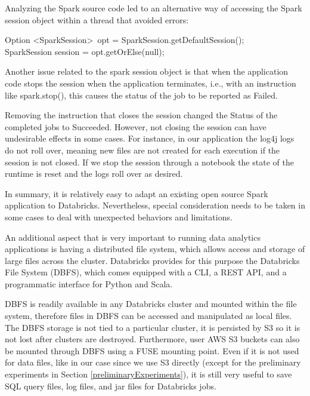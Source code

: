 Analyzing the Spark source code led to an alternative way of accessing the Spark session object within a thread that avoided errors:

\vspace{0.5cm}
\noindent Option \textless SparkSession\textgreater \ opt = SparkSession.getDefaultSession();\\
SparkSession session = opt.getOrElse(null);
\vspace{0.5cm}

Another issue related to the spark session object is that when the application code stops the session when the application terminates, i.e., with an instruction like spark.stop(), this causes the status of the job to be reported as Failed.

Removing the instruction that closes the session changed the Status of the completed jobs to Succeeded. However, not closing the session can have undesirable effects in some cases. For instance, in our application the log4j logs do not roll over, meaning new files are not created for each execution if the session is not closed. If we stop the session through a notebook the state of the runtime is reset and the logs roll over as desired.

In summary, it is relatively easy to adapt an existing open source Spark application to Databricks. Nevertheless, special consideration needs to be taken in some cases to deal with unexpected behaviors and limitations.

An additional aspect that is very important to running data analytics applications is having a distributed file system, which allows access and storage of large files across the cluster. Databricks provides for this purpose the Databricks File System (DBFS), which comes equipped with a CLI, a REST API, and a programmatic interface for Python and Scala.

DBFS is readily available in any Databricks cluster and mounted within the file system, therefore files in DBFS can be accessed and manipulated as local files. The DBFS storage is not tied to a particular cluster, it is persisted by S3 so it is not lost after clusters are destroyed. Furthermore, user AWS S3 buckets can also be mounted through DBFS using a FUSE mounting point. Even if it is not used for data files, like in our case since we use S3 directly (except for the preliminary experiments in Section \ref{preliminaryExperiments}), it is still very useful to save SQL query files, log files, and jar files for Databricks jobs.


